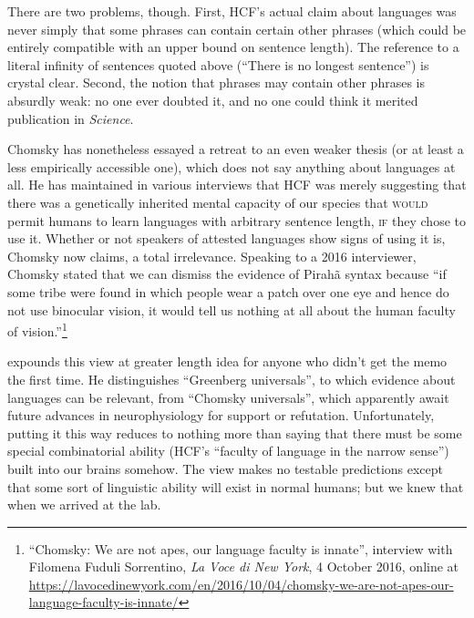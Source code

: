 \documentclass[output=paper,colorlinks,citecolor=brown
]{langscibook}
\begin{document}
There are two problems, though. First, HCF's actual claim about
languages was never simply that some phrases can contain certain other
phrases (which could be entirely compatible with an upper bound on
sentence length). The reference to a literal infinity of sentences
quoted above (``There is no longest sentence'') is crystal clear. Second,
the notion that phrases may contain other phrases is absurdly weak:
no one ever doubted it, and no one could think it merited publication
in \textit{Science}.

Chomsky has nonetheless essayed a retreat to an even weaker thesis
(or at least a less empirically accessible one), which does not say
anything about languages at all. He has maintained in various interviews
that HCF was merely suggesting that there was a genetically inherited
mental capacity of our species that \textsc{would} permit humans to
learn languages with arbitrary sentence length, \textsc{if} they chose
to use it. Whether or not speakers of attested languages show signs
of using it is, Chomsky now claims, a total irrelevance. Speaking to
a 2016 interviewer, Chomsky stated that we can dismiss the evidence of
Pirah{\~a} syntax because ``if some tribe were found in which people
wear a patch over one eye and hence do not use binocular vision, it
would tell us nothing at all about the human faculty of vision.''\footnote{%
   ``Chomsky: We are not apes, our language faculty is innate'', interview
   with Filomena Fuduli Sorrentino, \textit{La Voce di New York},
   4 October 2016, online at
   \url{https://lavocedinewyork.com/en/2016/10/04/chomsky-we-are-not-apes-our-language-faculty-is-innate/}}

\citet[792--794]{Hornstein19} expounds this view at
greater length idea for anyone who didn't get the memo the first time.
He distinguishes ``Greenberg universals'', to which evidence about languages
can be relevant, from ``Chomsky universals'', which apparently await future
advances in neurophysiology for support or refutation. Unfortunately,
putting it this way reduces to nothing more than saying that there
must be some special combinatorial ability (HCF's ``faculty of language
in the narrow sense'') built into our brains somehow. The view makes no
testable predictions except that some sort of linguistic ability will
exist in normal humans; but we knew that when we arrived at the lab.
\end{document}
